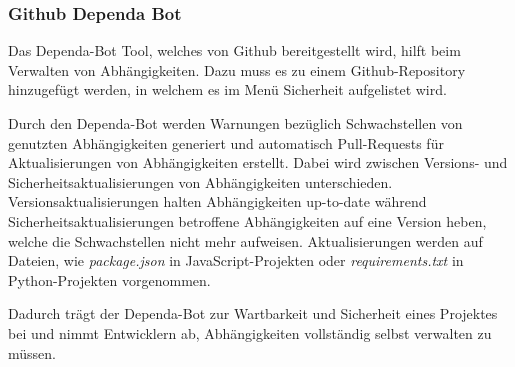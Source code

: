 \subsubsection{Github Dependa Bot} \label{sec:Dependa}
    Das Dependa-Bot Tool, welches von Github bereitgestellt wird, hilft beim Verwalten von Abhängig\-keiten.
    Dazu muss es zu einem Github-Repository hinzugefügt werden, in welchem es im Menü Sicherheit aufgelistet wird. %

    Durch den Dependa-Bot werden Warnungen bezüglich Schwachstellen von genutzten Abhängigkeiten generiert und automatisch Pull-Requests für Aktualisierungen von Abhängigkeiten erstellt.
    Dabei wird zwischen Versions- und Sicherheitsaktualisierungen von Abhängigkeiten unterschieden.
    Versionsaktualisierungen halten Abhängigkeiten up-to-date während Sicherheitsaktualisierungen betroffene Abhängigkeiten auf eine Version heben, welche die Schwachstellen nicht mehr aufweisen.
    Aktualisierungen werden auf Dateien, wie \textit{package.json} in JavaScript-Projekten oder \textit{requirements.txt} in Python-Projekten vorgenommen.

    Dadurch trägt der Dependa-Bot zur Wartbarkeit und Sicherheit eines Projektes bei und nimmt Entwicklern ab, Abhängigkeiten vollständig selbst verwalten zu müssen.